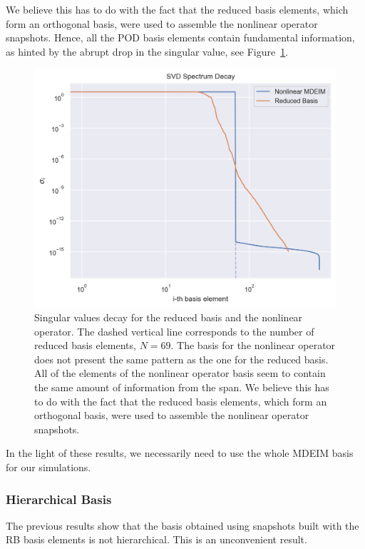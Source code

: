 \documentclass[../../thesis.tex]{subfiles}
\begin{document}
We believe this has to do with the fact that the reduced basis elements,
which form an orthogonal basis, were used to assemble the nonlinear operator snapshots.
Hence, all the POD basis elements contain fundamental information,
as hinted by the abrupt drop in the singular value, see Figure~\ref{fig:sigmas_decay}. 
\begin{figure}[h]
    \centering
    \includegraphics[width=1\columnwidth]{research_project/piston/figures/mdeim_certification/sigmas_problem.png}
    \caption{Singular values decay for the reduced basis and the nonlinear operator.
    The dashed vertical line corresponds to the number of reduced basis elements, $N=69$.
    The basis for the nonlinear operator does not present the same pattern as the 
    one for the reduced basis.
    All of the elements of the nonlinear operator basis 
    seem to contain the same amount of information from the span.
    We believe this has to do with the fact that the reduced basis elements,
    which form an orthogonal basis, were used to assemble the nonlinear operator snapshots.}
    \label{fig:sigmas_decay}
\end{figure}

In the light of these results, 
we necessarily need to use the whole MDEIM basis for our simulations.

\subsubsection{Hierarchical Basis}
The previous results show that the basis obtained using
snapshots built with the RB basis elements is not hierarchical.
This is an unconvenient result.
\end{document}
